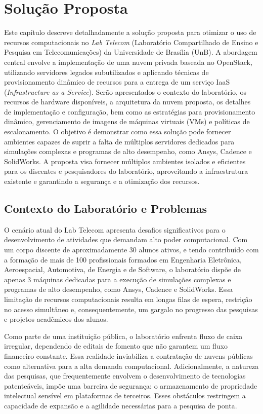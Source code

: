 \chapter{Solução Proposta}

Este capítulo descreve detalhadamente a solução proposta para otimizar o uso de recursos computacionais no \textit{Lab Telecom} (Laboratório Compartilhado de Ensino e Pesquisa em Telecomunicações) da Universidade de Brasília (UnB). A abordagem central envolve a implementação de uma nuvem privada baseada no OpenStack, utilizando servidores legados subutilizados e aplicando técnicas de provisionamento dinâmico de recursos para a entrega de um serviço IaaS (\textit{Infrastructure as a Service}). Serão apresentados o contexto do laboratório, os recursos de hardware disponíveis, a arquitetura da nuvem proposta, os detalhes de implementação e configuração, bem como as estratégias para provisionamento dinâmico, gerenciamento de imagens de máquinas virtuais (VMs) e políticas de escalonamento. O objetivo é demonstrar como essa solução pode fornecer ambientes capazes de suprir a falta de múltiplos servidores dedicados para simulações complexas e programas de alto desempenho, como Ansys, Cadence e SolidWorks. A proposta visa fornecer múltiplos ambientes isolados e eficientes para os discentes e pesquisadores do laboratório, aproveitando a infraestrutura existente e garantindo a segurança e a otimização dos recursos.

\section{Contexto do Laboratório e Problemas}

O cenário atual do Lab Telecom apresenta desafios significativos para o desenvolvimento de atividades que demandam alto poder computacional. Com um corpo discente de aproximadamente 30 alunos ativos, e tendo contribuído com a formação de mais de 100 profissionais formados em Engenharia Eletrônica, Aeroespacial, Automotiva, de Energia e de Software, o laboratório dispõe de apenas 3 máquinas dedicadas para a execução de simulações complexas e programas de alto desempenho, como Ansys, Cadence e SolidWorks. Essa limitação de recursos computacionais resulta em longas filas de espera, restrição no acesso simultâneo e, consequentemente, um gargalo no progresso das pesquisas e projetos acadêmicos dos alunos.

Como parte de uma instituição pública, o laboratório enfrenta fluxo de caixa irregular, dependendo de editais de fomento que não garantem um fluxo financeiro constante. Essa realidade inviabiliza a contratação de nuvens públicas como alternativa para a alta demanda computacional. Adicionalmente, a natureza das pesquisas, que frequentemente envolvem o desenvolvimento de tecnologias patenteáveis, impõe uma barreira de segurança: o armazenamento de propriedade intelectual sensível em plataformas de terceiros. Esses obstáculos restringem a capacidade de expansão e a agilidade necessárias para a pesquisa de ponta.

